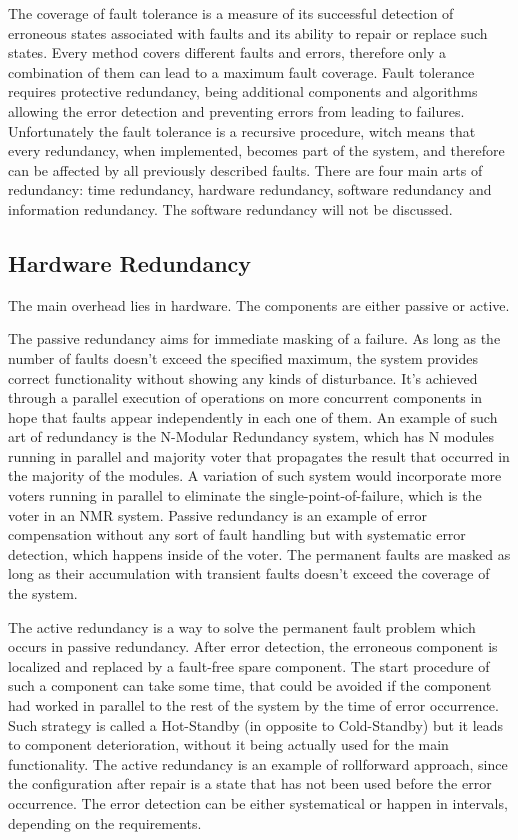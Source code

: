 The coverage of fault tolerance is a measure of its successful detection of erroneous states associated with faults and its ability to repair or replace such states. Every method covers different faults and errors, therefore only a combination of them can lead to a maximum fault coverage.
Fault tolerance requires protective redundancy, being additional components and algorithms allowing the error detection and preventing errors from leading to failures. Unfortunately the fault tolerance is a recursive procedure, witch means that every redundancy, when implemented, becomes part of the system, and therefore can be affected by all previously described faults.
There are four main arts of redundancy: time redundancy, hardware redundancy, software redundancy and information redundancy. The software redundancy will not be discussed.
\subsection{Hardware Redundancy} \label{ssec:HWred}
The main overhead lies in hardware. The components are either passive or active. 

The passive redundancy aims for immediate masking of a failure. As long as the number of faults doesn't exceed the specified maximum, the system provides correct functionality without showing any kinds of disturbance. It's achieved through a parallel execution of operations on more concurrent components in hope that faults appear independently in each one of them. An example of such art of redundancy is the N-Modular Redundancy system, which has N modules running in parallel and majority voter that propagates the result that occurred in the majority of the modules. A variation of such system would incorporate more voters running in parallel to eliminate the single-point-of-failure, which is the voter in an NMR system. Passive redundancy is an example of error compensation without any sort of fault handling but with systematic error detection, which happens inside of the voter. The permanent faults are masked as long as their accumulation with transient faults doesn't exceed the coverage of the system.

The active redundancy is a way to solve the permanent fault problem which occurs in passive redundancy. After error detection, the erroneous component is localized and replaced by a fault-free spare component. The start procedure of such a component can take some time, that could be avoided if the component had worked in parallel to the rest of the system by the time of error occurrence. Such strategy is called a Hot-Standby (in opposite to Cold-Standby) but it leads to component deterioration, without it being actually used for the main functionality. The active redundancy is an example of rollforward approach, since the configuration after repair is a state that has not been used before the error occurrence. The error detection can be either systematical or happen in intervals, depending on the requirements.


